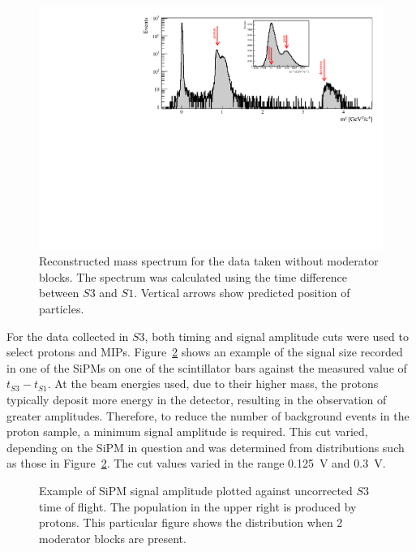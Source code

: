 \begin{figure}[h]
	\centering
	\includegraphics[width=0.9\linewidth]{files/Figures/Data_2018_8_31_b2_800MeV_0block_All.pdf}
	\caption{Reconstructed mass spectrum for the data taken without moderator blocks. The spectrum was calculated using the time difference between $\mathit{S3}$ and $\mathit{S1}$. Vertical arrows show predicted position of particles.}
	\label{fig:s3tof_mass}
\end{figure}

For the data collected in $\mathit{S3}$, both timing and signal amplitude cuts were used to select protons and MIPs.
Figure~\ref{fig:TvsA} shows an example of the signal size recorded in one of the SiPMs on one of the scintillator bars against the measured value of $t_{\mathit{S3}} - t_{\mathit{S1}}$.
At the beam energies used, due to their higher mass, the protons typically deposit more energy in the detector, resulting in the observation of greater amplitudes.
Therefore, to reduce the number of background events in the proton sample, a minimum signal amplitude is required.
This cut varied, depending on the SiPM in question and was determined from distributions such as those in Figure~\ref{fig:TvsA}. 
The cut values varied in the range 0.125~V and 0.3~V.

\begin{figure}[h]
  \begin{adjustbox}{max totalsize={.7\textwidth}, center}
    
  \end{adjustbox}
  \caption{Example of SiPM signal amplitude plotted against uncorrected $\mathit{S3}$ time of flight. The population in the upper right is produced by protons. This particular figure shows the distribution when 2 moderator blocks are present.}
  \label{fig:TvsA}
\end{figure}

